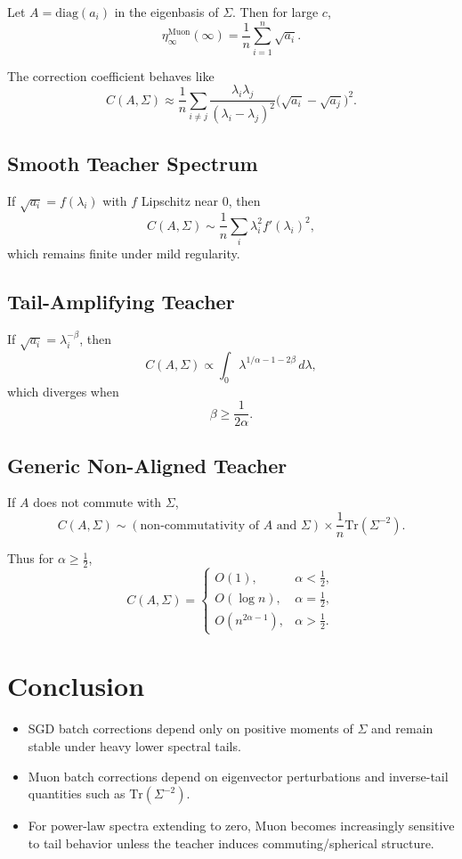 \documentclass[11pt]{article}
\begin{document}
Let $A = \mathrm{diag}(a_i)$ in the eigenbasis of $\Sigma$.
Then for large $c$,
\[
\eta_\infty^{\mathrm{Muon}}(\infty)
=
\frac{1}{n}\sum_{i=1}^n \sqrt{a_i}.
\]

The correction coefficient behaves like
\[
C(A,\Sigma)
\approx
\frac{1}{n}
\sum_{i \ne j}
\frac{\lambda_i \lambda_j}{(\lambda_i - \lambda_j)^2}
\big(\sqrt{a_i} - \sqrt{a_j}\big)^2.
\]

\subsection*{Smooth Teacher Spectrum}

If $\sqrt{a_i} = f(\lambda_i)$ with $f$ Lipschitz near $0$,
then
\[
C(A,\Sigma)
\sim
\frac{1}{n}
\sum_i
\lambda_i^2 f'(\lambda_i)^2,
\]
which remains finite under mild regularity.

\subsection*{Tail-Amplifying Teacher}

If $\sqrt{a_i} = \lambda_i^{-\beta}$,
then
\[
C(A,\Sigma)
\propto
\int_0
\lambda^{1/\alpha - 1 - 2\beta}
\, d\lambda,
\]
which diverges when
\[
\beta \ge \frac{1}{2\alpha}.
\]

\subsection*{Generic Non-Aligned Teacher}

If $A$ does not commute with $\Sigma$,
\[
C(A,\Sigma)
\sim
(\text{non-commutativity of }A\text{ and }\Sigma)
\times
\frac{1}{n}\mathrm{Tr}(\Sigma^{-2}).
\]

Thus for $\alpha \ge \tfrac12$,
\[
C(A,\Sigma)
=
\begin{cases}
O(1), & \alpha < \tfrac12,\\
O(\log n), & \alpha = \tfrac12,\\
O(n^{2\alpha-1}), & \alpha > \tfrac12.
\end{cases}
\]

\section{Conclusion}

\begin{itemize}
\item SGD batch corrections depend only on positive moments of $\Sigma$ and remain stable under heavy lower spectral tails.
\item Muon batch corrections depend on eigenvector perturbations and inverse-tail quantities such as $\mathrm{Tr}(\Sigma^{-2})$.
\item For power-law spectra extending to zero, Muon becomes increasingly sensitive to tail behavior unless the teacher induces commuting/spherical structure.
\end{itemize}
\end{document}

